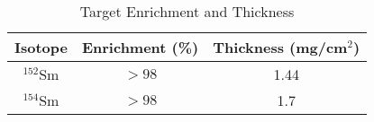 \begin{table}[]
    \centering
    \caption{Target Enrichment and Thickness}
    \begin{tabular}{c|c|c}
    \toprule
         Isotope & Enrichment (\%) & Thickness (mg/cm$^2$) \\
         \hline
         $^{152}$Sm & $>98$ & 1.44  \\ 
         $^{154}$Sm & $>98$ & 1.7 \\ 
         \bottomrule
    \end{tabular}
    \label{tab:target}
\end{table}